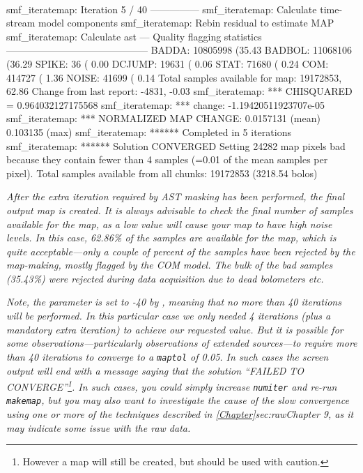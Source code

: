 \begin{terminalv}
~
\begin{terminalv}
smf_iteratemap: Iteration 5 / 40 ---------------
smf_iteratemap: Calculate time-stream model components
smf_iteratemap: Rebin residual to estimate MAP
smf_iteratemap: Calculate ast
--- Quality flagging statistics --------------------------------------------
 BADDA:   10805998 (35.43%
BADBOL:   11068106 (36.29%
 SPIKE:         36 ( 0.00%
DCJUMP:      19631 ( 0.06%
  STAT:      71680 ( 0.24%
   COM:     414727 ( 1.36%
 NOISE:      41699 ( 0.14%
Total samples available for map:   19172853, 62.86%
     Change from last report:      -4831, -0.03%
smf_iteratemap: *** CHISQUARED = 0.964032127175568
smf_iteratemap: *** change: -1.19420511923707e-05
smf_iteratemap: *** NORMALIZED MAP CHANGE: 0.0157131 (mean) 0.103135 (max)
smf_iteratemap: ****** Completed in 5 iterations
smf_iteratemap: ****** Solution CONVERGED
Setting 24282 map pixels bad because they contain fewer than 4 samples (=0.01
of the mean samples per pixel).
Total samples available from all chunks: 19172853 (3218.54 bolos)
\end{terminalv}

\emph{After the extra iteration required by AST masking has been
performed, the final output map is created. It is always advisable to
check the final number of samples available for the map, as a low value
will cause your map to have high noise levels. In this case, 62.86\% of
the samples are available for the map, which is quite acceptable---only
a couple of percent of the samples have been rejected by the map-making,
mostly flagged by the COM model. The bulk of the bad samples (35.43\%)
were rejected during data acquisition due to dead bolometers \emph{etc}.}

\emph{Note, the  parameter is set to -40 by
\brightcompact, meaning that no more than 40 iterations will be
performed. In this particular case we only needed 4 iterations (plus a
mandatory extra iteration) to achieve
our requested  value. But it is possible for some
observations---particularly observations of extended sources---to
require more than 40 iterations to converge to a \texttt{maptol} of 0.05.
In such cases the screen output will end with a message saying that the
solution ``FAILED TO CONVERGE''\footnote{However a map will still be
created, but should be used with caution.}. In such cases, you \emph{could}
simply increase \texttt{numiter} and re-run \texttt{makemap}, but you may
also want to investigate the cause of the slow convergence using one or more
of the techniques described in \cref{Chapter}{sec:raw}{Chapter 9}, as it
may indicate some issue with the raw data.}


\end{terminalv}
